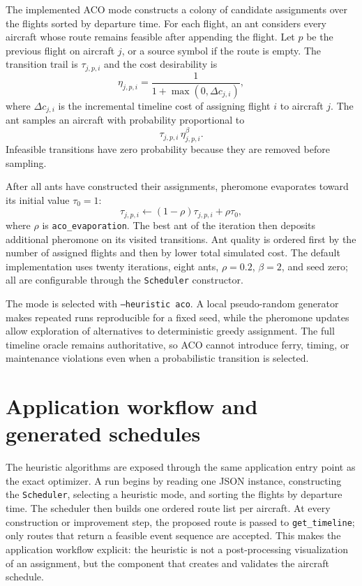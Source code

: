 The implemented ACO mode constructs a colony of candidate assignments over the flights sorted by departure time. For each flight, an ant considers every aircraft whose route remains feasible after appending the flight. Let $p$ be the previous flight on aircraft $j$, or a source symbol if the route is empty. The transition trail is $\tau_{j,p,i}$ and the cost desirability is
\begin{equation}
    \eta_{j,p,i} = \frac{1}{1+\max(0,\Delta c_{j,i})},
\end{equation}
where $\Delta c_{j,i}$ is the incremental timeline cost of assigning flight $i$ to aircraft $j$. The ant samples an aircraft with probability proportional to
\begin{equation}
    \tau_{j,p,i}\,\eta_{j,p,i}^{\beta}.
\end{equation}
Infeasible transitions have zero probability because they are removed before sampling.

After all ants have constructed their assignments, pheromone evaporates toward its initial value $\tau_0=1$:
\begin{equation}
    \tau_{j,p,i} \leftarrow (1-\rho)\tau_{j,p,i}+\rho\tau_0,
\end{equation}
where $\rho$ is \texttt{aco\_evaporation}. The best ant of the iteration then deposits additional pheromone on its visited transitions. Ant quality is ordered first by the number of assigned flights and then by lower total simulated cost. The default implementation uses twenty iterations, eight ants, $\rho=0.2$, $\beta=2$, and seed zero; all are configurable through the \texttt{Scheduler} constructor.

The mode is selected with \texttt{--heuristic aco}. A local pseudo-random generator makes repeated runs reproducible for a fixed seed, while the pheromone updates allow exploration of alternatives to deterministic greedy assignment. The full timeline oracle remains authoritative, so ACO cannot introduce ferry, timing, or maintenance violations even when a probabilistic transition is selected.

\section{Application workflow and generated schedules}
\label{sec:heuristic_application}

The heuristic algorithms are exposed through the same application entry point
as the exact optimizer. A run begins by reading one JSON instance, constructing
the \texttt{Scheduler}, selecting a heuristic mode, and sorting the flights by
departure time. The scheduler then builds one ordered route list per aircraft.
At every construction or improvement step, the proposed route is passed to
\texttt{get\_timeline}; only routes that return a feasible event sequence are
accepted. This makes the application workflow explicit: the heuristic is not a
post-processing visualization of an assignment, but the component that creates
and validates the aircraft schedule.

